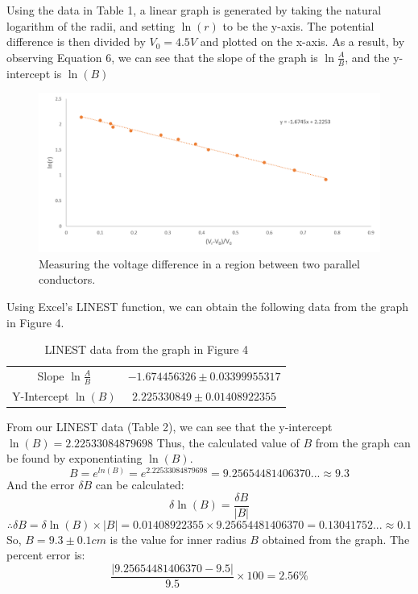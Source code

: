 \documentclass[letterpaper]{article}
\begin{document}
Using the data in Table 1, a linear graph is generated by taking the natural logarithm of the
radii, and setting $\ln{(r)}$ to be the y-axis. The potential difference is then divided by $V_0=4.5 V$
and plotted on the x-axis. As a result, by observing Equation 6, we can see that the
slope of the graph is $\ln{\frac{A}{B}}$, and the y-intercept is $\ln{(B)}$
\begin{figure}[H]
  \centering
  \includegraphics[width=\textwidth]{chart1.png}
  \caption{Measuring the voltage difference in a region between two parallel conductors.}
\end{figure}
\newpage
Using Excel's LINEST function, we can obtain the following data from the graph in Figure 4.
\begin{table}[H]
\centering
\begin{tabular}{cc}
  Slope  $\ln{\frac{A}{B}}$ &  $-1.674456326\pm0.03399955317$ \\
  Y-Intercept $\ln{(B)}$   &  $2.225330849\pm0.01408922355$ \\
\end{tabular}
\caption{LINEST data from the graph in Figure 4}
\end{table}


From our LINEST data (Table 2), we can see that the y-intercept $\ln{(B)}=2.22533084879698$
Thus, the calculated value of $B$ from the graph can be found by exponentiating $\ln{(B)}$.\\
  $$B= e^{ln(B)} = e^{2.22533084879698}=9.25654481406370...\approx 9.3$$
And the error $\delta B$ can be calculated:
$$ \delta \ln{(B)} = \frac{\delta B}{|B|}$$
$$ \therefore \delta B = \delta \ln{(B)} \times |B| = 0.01408922355 \times 9.25654481406370 = 0.13041752...\approx 0.1  $$
So, $B=9.3\pm 0.1 cm$ is the value for inner radius $B$ obtained from the graph.
The percent error is:
$$ \frac{|9.25654481406370-9.5|}{9.5}\times100 = 2.56\%$$
\end{document}
